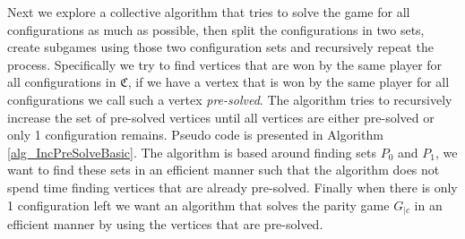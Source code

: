 Next we explore a collective algorithm that tries to solve the game for all configurations as much as possible, then split the configurations in two sets, create subgames using those two configuration sets and recursively repeat the process. Specifically we try to find vertices that are won by the same player for all configurations in $\mathfrak{C}$, if we have a vertex that is won by the same player for all configurations we call such a vertex \textit{pre-solved}. The algorithm tries to recursively increase the set of pre-solved vertices until all vertices are either pre-solved or only 1 configuration remains. Pseudo code is presented in Algorithm \ref{alg_IncPreSolveBasic}. The algorithm is based around finding sets $P_0$ and $P_1$, we want to find these sets in an efficient manner such that the algorithm does not spend time finding vertices that are already pre-solved. Finally when there is only 1 configuration left we want an algorithm that solves the parity game $G_{|c}$ in an efficient manner by using the vertices that are pre-solved.


